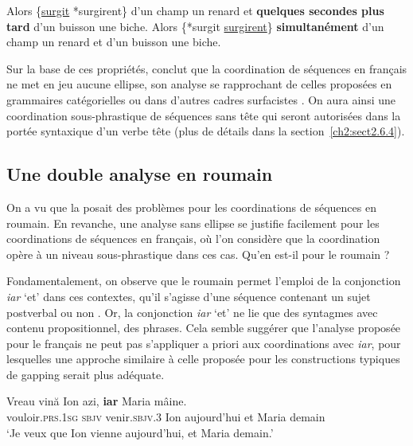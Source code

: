 \ea \label{ch2:ex301}
\ea Alors \{\uline{surgit} {\textbar} *surgirent\} d’un champ un renard et \textbf{quelques secondes plus tard} d’un buisson une biche. \label{ch2:ex301a} 
\ex Alors \{*surgit {\textbar} \uline{surgirent}\} \textbf{simultanément} d’un champ un renard et d’un buisson une biche. \label{ch2:ex301b} 
\z
\z

Sur la base de ces propriétés, \citet{Mouret2006,Mouret2007,Mouret2008} conclut que la coordination de séquences en français ne met en jeu aucune ellipse, son analyse se rapprochant de celles proposées en grammaires catégorielles \citep{Dowty1988,Steedman1990,Steedman2000} ou dans d’autres cadres surfacistes \citep{Hudson1988,MaxwellEtAl1996}. On aura ainsi une coordination sous-phrastique de séquences sans tête qui seront autorisées dans la portée syntaxique d’un verbe tête (plus de détails dans la section~\ref{ch2:sect2.6.4}).


\subsection{Une double analyse en roumain} \label{ch2:sect2.6.3}


On a vu que la  posait des problèmes pour les coordinations de séquences en roumain. En revanche, une analyse sans ellipse se justifie facilement pour les coordinations de séquences en français, où l’on considère que la coordination opère à un niveau sous-phrastique dans ces cas. Qu’en est-il pour le roumain ?

Fondamentalement, on observe que le roumain permet l’emploi de la conjonction \textit{iar} ‘et’ dans ces contextes, qu’il s’agisse d’une séquence contenant un sujet postverbal  ou non . Or, la conjonction \textit{iar} ‘et’ ne lie que des syntagmes avec contenu propositionnel, {\cad} des phrases. Cela semble suggérer que l’analyse proposée pour le français ne peut pas s’appliquer a priori aux coordinations avec \textit{iar}, pour lesquelles une approche similaire à celle proposée pour les constructions typiques de gapping serait plus adéquate.  

\ea \label{ch2:ex302}
\ea 
\gll Vreau    vină  Ion  azi,  \textbf{iar}  Maria  mâine. \label{ch2:ex302a}\\
vouloir.\textsc{prs.1sg}  \textsc{sbjv}  venir.\textsc{sbjv.3}  Ion  aujourd’hui  et  Maria  demain\\
\glt ‘Je veux que Ion vienne aujourd’hui, et Maria demain.’

